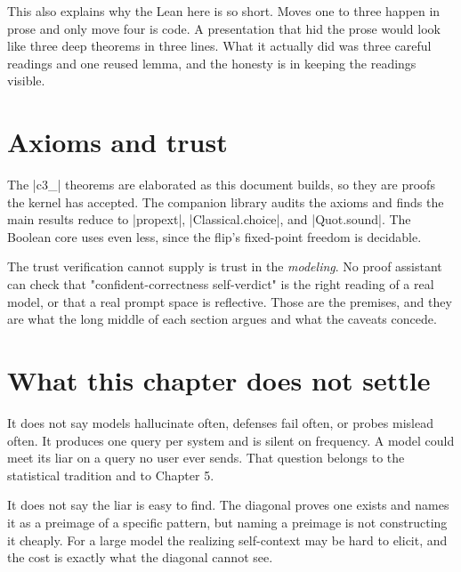 \documentclass{memoir}
\begin{document}
This also explains why the Lean here is so short. Moves one to three happen in
prose and only move four is code. A presentation that hid the prose would look
like three deep theorems in three lines. What it actually did was three careful
readings and one reused lemma, and the honesty is in keeping the readings
visible.



\section{Axioms and trust}\label{Two--Schemas--of--Impossibility-005F-005F-005F--Machine--Checked--Limits--of--Trustworthy--Machine--Learning-005F-005F-005F--and--Why--They--Tighten--with--Capability----Three--Trilemmata-005F-005F-005F--One--Theorem----Axioms--and--trust}

The \LeanVerb|c3_| theorems are elaborated as this document builds, so they are proofs
the kernel has accepted. The companion library audits the axioms and finds the
main results reduce to \LeanVerb|propext|, \LeanVerb|Classical.choice|, and \LeanVerb|Quot.sound|. The
Boolean core uses even less, since the flip's fixed-point freedom is decidable.

The trust verification cannot supply is trust in the \emph{modeling}. No proof
assistant can check that "confident-correctness self-verdict" is the right
reading of a real model, or that a real prompt space is reflective. Those are
the premises, and they are what the long middle of each section argues and what
the caveats concede.



\section{What this chapter does not settle}\label{Two--Schemas--of--Impossibility-005F-005F-005F--Machine--Checked--Limits--of--Trustworthy--Machine--Learning-005F-005F-005F--and--Why--They--Tighten--with--Capability----Three--Trilemmata-005F-005F-005F--One--Theorem----What--this--chapter--does--not--settle}

It does not say models hallucinate often, defenses fail often, or probes mislead
often. It produces one query per system and is silent on frequency. A model
could meet its liar on a query no user ever sends. That question belongs to the
statistical tradition and to Chapter 5.

It does not say the liar is easy to find. The diagonal proves one exists and
names it as a preimage of a specific pattern, but naming a preimage is not
constructing it cheaply. For a large model the realizing self-context may be
hard to elicit, and the cost is exactly what the diagonal cannot see.
\end{document}
